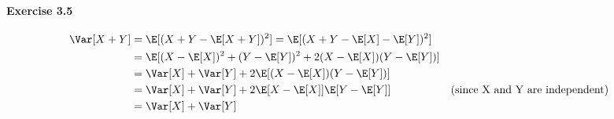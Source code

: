 \paragraph{Exercise 3.5}
\begin{align*}
  \Var[X + Y] &= \E[(X + Y - \E[X + Y])^2] = \E[(X + Y - \E[X] - \E[Y])^2] \\
              &= \E[(X - \E[X])^2 + (Y - \E[Y])^2 + 2(X - \E[X])(Y - \E[Y])] \\
              &= \Var[X] + \Var[Y] + 2\E[(X - \E[X])(Y - \E[Y])] \\
              &= \Var[X] + \Var[Y] + 2\E[X - \E[X]]\E[Y - \E[Y]] && (\text{since X and Y are independent}) \\
              &= \Var[X] + \Var[Y]
\end{align*}


